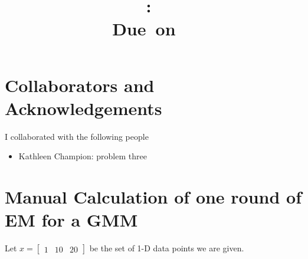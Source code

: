 \documentclass{article}
\title{
    \vspace{2in}
    \textmd{\textbf{\hmwkClass:\ \hmwkTitle}}\\
    \normalsize\vspace{0.1in}\small{Due\ on\ \hmwkDueDate\ }\\
    \vspace{3in}
}
\author{\textbf{\hmwkAuthorName}}
\date{}
\newcommand{\bbm}{\begin{bmatrix}}
\newcommand{\ebm}{\end{bmatrix}}
\begin{document}
\maketitle

\pagebreak

\section{Collaborators and Acknowledgements}

I collaborated with the following people
\begin{itemize}
    \item Kathleen Champion: problem three
\end{itemize}

\section{Manual Calculation of one round of EM for a GMM}
Let $x=\bbm 1&10&20\ebm$ be the set of 1-D data points we are given.
\end{document}
